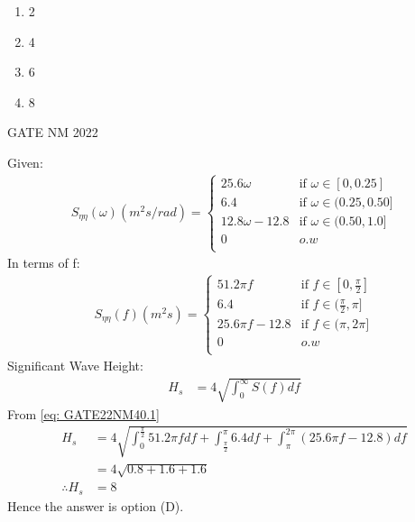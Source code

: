 \documentclass[journal,12pt,onecolumn]{IEEEtran}
\theoremstyle{remark}
\begin{document}
\begin{enumerate}[label=(\Alph*)]
\item 2
\item 4
\item 6
\item 8
\end{enumerate}
\hfill{GATE NM 2022}


\solution
\fi
Given:
\begin{align}
S_{\eta \eta}(\omega)(m^2s/rad) = 
\begin{cases}
  25.6\omega   & \text{if } \omega \in [0,0.25] \\
  6.4  & \text{if } \omega \in (0.25,0.50] \\
  12.8\omega-12.8  & \text{if } \omega \in (0.50,1.0] \\
  0  & o.w \\
\end{cases}
\end{align}
In terms of f:
\begin{align}
S_{\eta \eta}(f)(m^2s) = 
\begin{cases}
  51.2\pi f   & \text{if } f \in [0,\frac{\pi}{2}] \\
  6.4  & \text{if } f \in (\frac{\pi}{2},\pi] \\
  25.6\pi f-12.8  & \text{if } f \in (\pi,2\pi] \\
  0 & o.w \\
\end{cases} \label{eq: GATE22NM40.1}
\end{align}
Significant Wave Height:
\begin{align}
H_s &= 4 \sqrt{\int_{0}^{\infty} S(f)df}
\end{align}
From \eqref{eq: GATE22NM40.1}
\begin{align}
H_s &= 4 \sqrt{\int_{0}^{\frac{\pi}{2}} 51.2\pi fdf + \int_{\frac{\pi}{2}}^{\pi} 6.4df + \int_{\pi}^{2\pi} (25.6\pi f-12.8)df} \\
&= 4 \sqrt{0.8 +1.6 +1.6} \\
\therefore H_s &= 8
\end{align}
Hence the answer is option (D).
%


\end{document}
